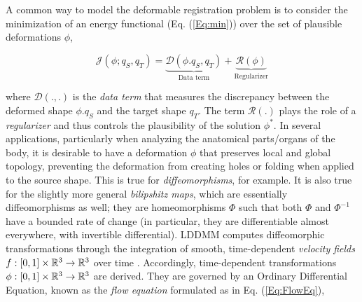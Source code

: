 A common way to model the deformable registration problem is to consider the minimization of an energy functional (Eq. (\ref{Eq:min})) over the set of plausible deformations $\phi$,

\begin{equation} 
\mathcal{J}(\phi;q_S,q_T) = \underbrace{\mathcal{D}(\phi.q_S,q_T)}_{\text{Data term}} + \underbrace{\mathcal{R}(\phi)}_{\text{Regularizer}} 
\label{Eq:min}
\end{equation}

\noindent
where $\mathcal{D}(.,.)$ is the \textit{data term} that measures the discrepancy between the deformed shape $\phi.q_S$ and the target shape $q_T$. The term $\mathcal{R}(.)$ plays the role of a \textit{regularizer} and thus controls the plausibility of the solution $\phi^*$. In several applications, particularly when analyzing the anatomical parts/organs of the body, it is desirable to have a deformation $\phi$ that preserves local and global topology, preventing the deformation from creating holes or folding when applied to the source shape. This is true for \textit{diffeomorphisms}, for example. It is also true for the slightly more general \textit{bilipshitz maps}, which are essentially diffeomorphisms as well; they are homeomorphisms $\Phi$ such that both $\Phi$ and $\Phi^{-1}$ have a bounded rate of change (in particular, they are differentiable almost everywhere, with invertible differential).
LDDMM computes diffeomorphic transformations through the integration of smooth, time-dependent \textit{velocity fields} $f:[0,1]\times \mathbb{R}^3 \to \mathbb{R}^3$ over time \cite{beg2005computing}. Accordingly, time-dependent transformations $\phi:[0,1]\times \mathbb{R}^3 \to \mathbb{R}^3$ are derived. They are governed by an Ordinary Differential Equation, known as the \textit{flow equation} \cite{dupuis1998variational} formulated as in Eq. (\ref{Eq:FlowEq}),

